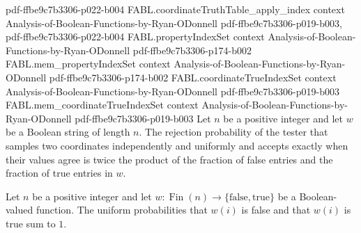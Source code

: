 \begin{theorem}
{    pdf-ffbe9c7b3306-p022-b004}
\proofstep
  {FABL.coordinateTruthTable_apply_index}
  {context}
  {Analysis-of-Boolean-Functions-by-Ryan-ODonnell}
  {pdf-ffbe9c7b3306-p019-b003,
    pdf-ffbe9c7b3306-p022-b004}
\proofstep
  {FABL.propertyIndexSet}
  {context}
  {Analysis-of-Boolean-Functions-by-Ryan-ODonnell}
  {pdf-ffbe9c7b3306-p174-b002}
\proofstep
  {FABL.mem_propertyIndexSet}
  {context}
  {Analysis-of-Boolean-Functions-by-Ryan-ODonnell}
  {pdf-ffbe9c7b3306-p174-b002}
\proofstep
  {FABL.coordinateTrueIndexSet}
  {context}
  {Analysis-of-Boolean-Functions-by-Ryan-ODonnell}
  {pdf-ffbe9c7b3306-p019-b003}
\proofstep
  {FABL.mem_coordinateTrueIndexSet}
  {context}
  {Analysis-of-Boolean-Functions-by-Ryan-ODonnell}
  {pdf-ffbe9c7b3306-p019-b003}
Let $n$ be a positive integer and let $w$ be a Boolean string of length $n$. The
rejection probability of the tester that samples two coordinates independently and
uniformly and accepts exactly when their values agree is twice the product of the
fraction of false entries and the fraction of true entries in $w$.
\end{theorem}

\begin{theorem}
\label{FABL.uniformProbability_bool_false_add_true}
\leanok
{}
Let $n$ be a positive integer and let
$w:\operatorname{Fin}(n)\to\{\mathrm{false},\mathrm{true}\}$ be a Boolean-valued
function. The uniform probabilities that $w(i)$ is false and that $w(i)$ is true sum to
$1$.
\end{theorem}

